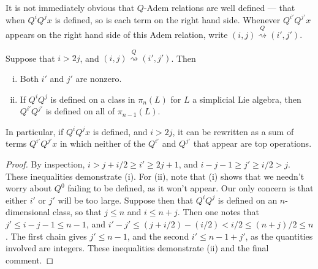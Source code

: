 \documentclass[11pt]{article}
\newcommand{\produces}[1]{\overset{#1}{\rightsquigarrow}}
\newcommand{\restn}[1]{\xi{#1}}
\newcommand{\LambdaOp}{Q}
\begin{document}
\begin{CategoriesOfInterest}
\begin{prop*}
%
%
%
%
\end{prop*}
\noindent It is not immediately obvious that $\LambdaOp$-Adem relations are well defined --- that when $\LambdaOp^i\LambdaOp^jx$ is defined, so is each term on the right hand side. Whenever $\LambdaOp^{i'}\LambdaOp^{j'}x$ appears on the right hand side of this Adem relation, write $(i,j)\produces{\LambdaOp}(i',j')$. 
\begin{lem*}
Suppose that $i>2j$, and $(i,j)\produces{\LambdaOp}(i',j')$. Then
\begin{enumerate}[i)]\squishlist
\setlength{\parindent}{.25in}
\item Both $i'$ and $j'$ are nonzero.
\item If $\LambdaOp^i\LambdaOp^j$ is defined on a class in $\pi_n (L)$ for $L$ a simplicial Lie algebra, then $\LambdaOp^{i'}\LambdaOp^{j'}$ is defined on all of $\pi_{n-1}(L)$.
\end{enumerate}
In particular, if $\LambdaOp^i\LambdaOp^jx$ is defined, and $i>2j$, it can be rewritten as a sum of terms $\LambdaOp^{i'}\LambdaOp^{j'}x$ in which neither of the $\LambdaOp^{i'}$ and $\LambdaOp^{j'}$ that appear are top operations.
\end{lem*}
\begin{proof}
By inspection, $i>j+i/2\geq i'\geq2j+1$, and $i-j-1\geq j'\geq i/2>j$. These inequalities demonstrate (i). For (ii), note that (i) shows that we needn't worry about $\LambdaOp^0$ failing to be defined, as it won't appear. Our only concern is that either $i'$ or $j'$ will be too large. Suppose then that $\LambdaOp^i\LambdaOp^j$ is defined on an $n$-dimensional class, so that $j\leq n$ and $i\leq n+j$. Then one notes that $j'\leq i-j-1\leq n-1$, and $i'-j'\leq (j+i/2)-(i/2)<i/2\leq(n+j)/2\leq n$. The first chain gives $j'\leq n-1$, and the second $i'\leq n-1+j'$, as the quantities involved are integers. These inequalities demonstrate (ii) and the final comment.

\end{proof}
\end{CategoriesOfInterest}
\end{document}
